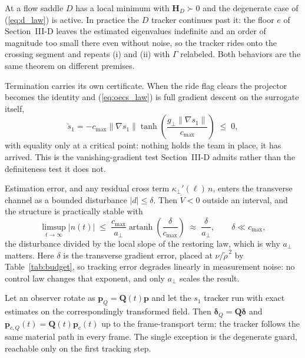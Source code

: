 At a flow saddle $D$ has a local minimum with $\mathbf{H}_D \succ 0$ and
the degenerate case of (\ref{eq:d_law}) is active. In practice the $D$
tracker continues past it: the floor $e$ of Section~\mbox{III-D} leaves
the estimated eigenvalues indefinite and an order of magnitude too small
there even without noise, so the tracker rides onto the crossing segment
and repeats (i) and (ii) with $\Gamma$ relabeled. Both behaviors are the
same theorem on different premises.

Termination carries its own certificate. When the ride flag clears the
projector becomes the identity and (\ref{eq:oecs_law}) is full gradient
descent on the surrogate itself,
\begin{equation}
    \dot{s}_1 = -c_{\max}\lVert\nabla s_1\rVert
    \tanh\!\left(\frac{g_\perp\lVert\nabla s_1\rVert}{c_{\max}}\right)
    \;\leq\; 0,
    \label{eq:s1_lyapunov}
\end{equation}
with equality only at a critical point: nothing holds the team in place,
it has arrived. This is the vanishing-gradient test
Section~\mbox{III-D} admits rather than the definiteness test it does
not.

Estimation error, and any residual cross term $\kappa_\perp'(\ell)\,n$,
enters the transverse channel as a bounded disturbance $|d| \leq
\delta$. Then $\dot{V} < 0$ outside an interval, and the structure is
practically stable with
\begin{equation}
    \limsup_{t\to\infty}|n(t)| \;\leq\;
    \frac{c_{\max}}{a_\perp}
    \operatorname{artanh}\!\left(\frac{\delta}{c_{\max}}\right)
    \;\approx\; \frac{\delta}{a_\perp},
    \qquad \delta \ll c_{\max},
    \label{eq:iss_bound}
\end{equation}
the disturbance divided by the local slope of the restoring law, which
is why $a_\perp$ matters. Here $\delta$ is the transverse gradient
error, placed at $\nu/\tilde{\rho}^{\,2}$ by Table~\ref{tab:budget}, so
tracking error degrades linearly in measurement noise: no control law
changes that exponent, and only $a_\perp$ scales the result.

\begin{proposition}
\label{prop:equivariance}
Let an observer rotate as $\mathbf{p}_Q = \mathbf{Q}(t)\mathbf{p}$ and
let the $s_1$ tracker run with exact estimates on the correspondingly
transformed field. Then $\boldsymbol{\delta}_Q =
\mathbf{Q}\boldsymbol{\delta}$ and $\mathbf{p}_{c,Q}(t) =
\mathbf{Q}(t)\mathbf{p}_c(t)$ up to the frame-transport term: the
tracker follows the same material path in every frame. The single
exception is the degenerate guard, reachable only on the first tracking
step.
\end{proposition}


